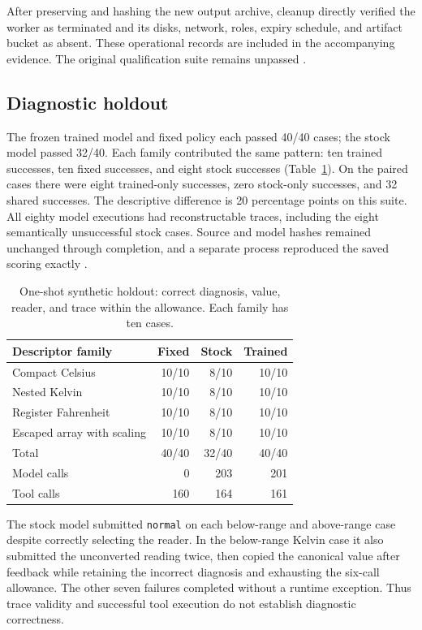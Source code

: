 \documentclass[11pt,letterpaper]{article}
\begin{document}
After preserving and hashing the new output archive, cleanup directly verified
the worker as terminated and its disks, network, roles, expiry schedule, and
artifact bucket as absent. These operational records are included in the
accompanying evidence. The original qualification suite remains unpassed
\cite{correctedcontrols}.

\subsection{Diagnostic holdout}

The frozen trained model and fixed policy each passed 40/40 cases; the stock
model passed 32/40. Each family contributed the same pattern: ten trained
successes, ten fixed successes, and eight stock successes
(Table~\ref{tab:holdout}). On the paired cases there were eight trained-only
successes, zero stock-only successes, and 32 shared successes. The descriptive
difference is 20 percentage points on this suite. All eighty model executions
had reconstructable traces, including the eight semantically unsuccessful
stock cases. Source and model hashes remained unchanged through completion,
and a separate process reproduced the saved scoring exactly \cite{holdout}.

\begin{table}[htbp]
\centering\small
\caption{One-shot synthetic holdout: correct diagnosis, value, reader, and
trace within the allowance. Each family has ten cases.}
\label{tab:holdout}
\begin{tabular}{@{}lrrr@{}}
\toprule
Descriptor family & Fixed & Stock & Trained\\
\midrule
Compact Celsius & 10/10 & 8/10 & 10/10\\
Nested Kelvin & 10/10 & 8/10 & 10/10\\
Register Fahrenheit & 10/10 & 8/10 & 10/10\\
Escaped array with scaling & 10/10 & 8/10 & 10/10\\
\midrule
Total & 40/40 & 32/40 & 40/40\\
Model calls & 0 & 203 & 201\\
Tool calls & 160 & 164 & 161\\
\bottomrule
\end{tabular}
\end{table}

The stock model submitted \texttt{normal} on each below-range and above-range
case despite correctly selecting the reader. In the below-range Kelvin case it
also submitted the unconverted reading twice, then copied the canonical value
after feedback while retaining the incorrect diagnosis and exhausting the
six-call allowance. The other seven failures completed without a runtime
exception. Thus trace validity and successful tool execution do not establish
diagnostic correctness.
\end{document}
